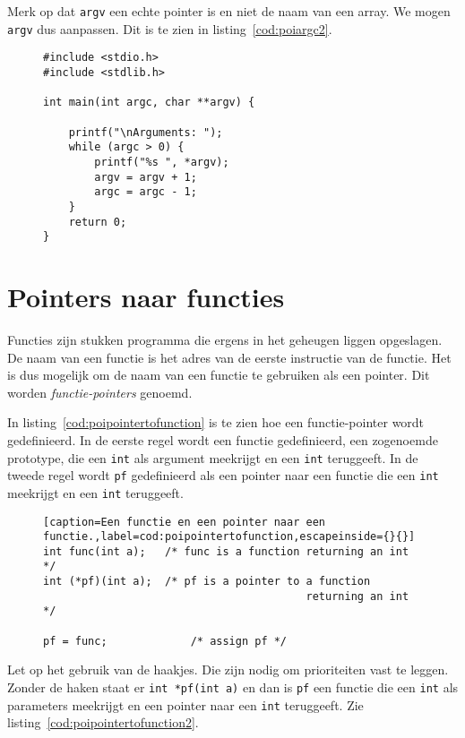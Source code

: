 Merk op dat \texttt{argv} een echte pointer is en niet de naam van een array. We mogen \texttt{argv} dus aanpassen. Dit is te zien in listing~\ref{cod:poiargc2}.

\begin{figure}[!ht]
\begin{lstlisting}[caption=Afdrukken van argumenten.,label=cod:poiargc2]
#include <stdio.h>
#include <stdlib.h>

int main(int argc, char **argv) {

    printf("\nArguments: ");
    while (argc > 0) {
        printf("%s ", *argv);
        argv = argv + 1;
        argc = argc - 1;
    }
    return 0;
}
\end{lstlisting}
\end{figure}


\section{Pointers naar functies}
\label{sec:pointersnaarfunctie}
Functies zijn stukken programma die ergens in het geheugen liggen opgeslagen. De naam van een functie is het adres van de eerste instructie van de functie. Het is dus mogelijk om de naam van een functie te gebruiken als een pointer. Dit worden \textsl{functie-pointers} genoemd.

In listing~\ref{cod:poipointertofunction} is te zien hoe een functie-pointer wordt gedefinieerd. In de eerste regel wordt een functie gedefinieerd, een zogenoemde prototype, die een \texttt{int} als argument meekrijgt en een \texttt{int} teruggeeft. In de tweede regel wordt \texttt{pf} gedefinieerd als een pointer naar een functie die een \texttt{int} meekrijgt en een \texttt{int} teruggeeft.

\begin{figure}[!ht]
\begin{lstlisting}[caption=Een functie en een pointer naar een functie.,label=cod:poipointertofunction,escapeinside={}{}]
int func(int a);   /* func is a function returning an int */
int (*pf)(int a);  /* pf is a pointer to a function
                                         returning an int */

pf = func;             /* assign pf */
\end{lstlisting}
\end{figure}

Let op het gebruik van de haakjes. Die zijn nodig om prioriteiten vast te leggen. Zonder de haken staat er \texttt{int *pf(int a)} en dan is \texttt{pf} een functie die een \texttt{int} als parameters meekrijgt en een pointer naar een \texttt{int} teruggeeft. Zie listing~\ref{cod:poipointertofunction2}.

